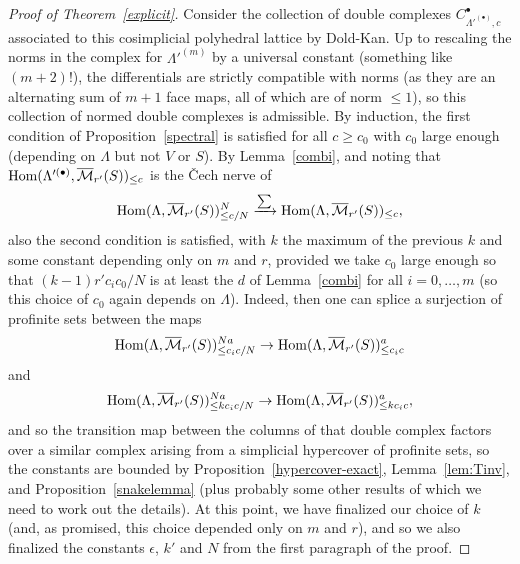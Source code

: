 \begin{proof}[Proof of Theorem~\ref{explicit}]
Consider the collection of double complexes $C_{\Lambda'^{(\bullet)},c}^\bullet$ associated to this cosimplicial polyhedral lattice by Dold-Kan. Up to rescaling the norms in the complex for $\Lambda'^{(m)}$ by a universal constant (something like $(m+2)!$), the differentials are strictly compatible with norms (as they are an alternating sum of $m+1$ face maps, all of which are of norm $\leq 1$), so this collection of normed double complexes is admissible. By induction, the first condition of Proposition~\ref{spectral} is satisfied for all $c\geq c_0$ with $c_0$ large enough (depending on $\Lambda$ but not $V$ or $S$). By Lemma~\ref{combi}, and noting that $\operatorname{Hom}(\Lambda'^{(\bullet)},\overline{\mathcal M}_{r'}(S))_{\leq c}$ is the \v{C}ech nerve of
\[
\operatorname{Hom}(\Lambda,\overline{\mathcal M}_{r'}(S))_{\leq c/N}^N\xrightarrow{\sum} \operatorname{Hom}(\Lambda,\overline{\mathcal M}_{r'}(S))_{\leq c},
\]
also the second condition is satisfied, with $k$ the maximum of the previous $k$ and some constant depending only on $m$ and $r$, provided we take $c_0$ large enough so that $(k-1)r'c_ic_0/N$ is at least the $d$ of Lemma~\ref{combi} for all $i=0,\ldots,m$ (so this choice of $c_0$ again depends on $\Lambda$). Indeed, then one can splice a surjection of profinite sets between the maps
\[
\operatorname{Hom}(\Lambda,\overline{\mathcal M}_{r'}(S))_{\leq c_ic/N}^{Na}\to\operatorname{Hom}(\Lambda,\overline{\mathcal M}_{r'}(S))_{\leq c_ic}^a
\]
and
\[
\operatorname{Hom}(\Lambda,\overline{\mathcal M}_{r'}(S))_{\leq kc_ic/N}^{Na}\to \operatorname{Hom}(\Lambda,\overline{\mathcal M}_{r'}(S))_{\leq kc_ic}^a,
\]
and so the transition map between the columns of that double complex factors over a similar complex arising from a simplicial hypercover of profinite sets, so the constants are bounded by Proposition~\ref{hypercover-exact},
	Lemma~\ref{lem:Tinv},
	and Proposition~\ref{snakelemma}
	(plus probably some other results of which we need to work out the details).
	At this point, we have finalized our choice of $k$ (and, as promised, this choice depended only on $m$ and $r$), and so we also finalized the constants $\epsilon$, $k'$ and $N$ from the first paragraph of the proof.


\end{proof}
